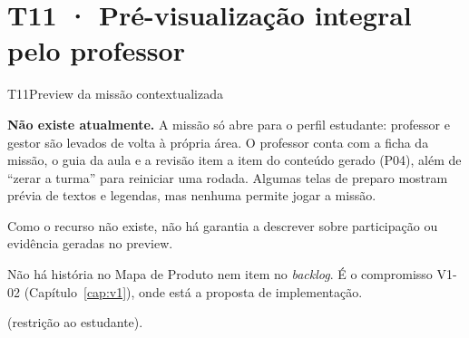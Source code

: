\section{T11 · Pré-visualização integral pelo professor}
\label{sec:t11}

\begin{resposta}{T11}{Preview da missão contextualizada}{\naoexiste}
\begin{campos}
  \item[Hoje] \textbf{Não existe atualmente.} A missão só abre para o perfil
    estudante: professor e gestor são levados de volta à própria área. O
    professor conta com a ficha da missão, o guia da aula e a revisão item a
    item do conteúdo gerado (P04), além de ``zerar a turma'' para reiniciar
    uma rodada. Algumas telas de preparo mostram prévia de textos e
    legendas, mas nenhuma permite jogar a missão.
  \item[Limitações] Como o recurso não existe, não há garantia a descrever
    sobre participação ou evidência geradas no preview.
  \item[Planejado] Não há história no Mapa de Produto nem item no
    \emph{backlog}. É o compromisso V1-02 (Capítulo~\ref{cap:v1}), onde está a
    proposta de implementação.
  \item[Evidência]  (restrição ao
    estudante).
\end{campos}
\end{resposta}
